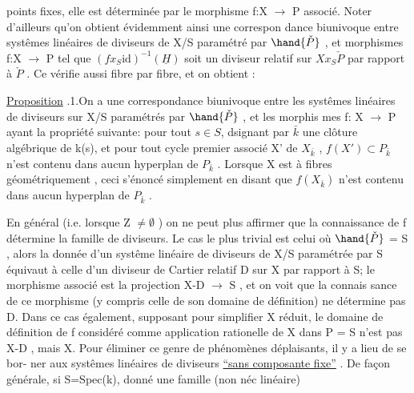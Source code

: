 
points fixes, elle est déterminée  par le morphisme f:X $\longrightarrow$ P
associé. Noter d'ailleurs qu'on obtient évidemment ainsi une correspon
dance biunivoque entre systêmes linéaires de diviseurs de X/S paramétré
par $\hand{\check{P}}$ , et morphismes f:X $\longrightarrow$ P tel que $(fx_S\mathrm{id})^{-1}(\underline{H})$ soit un
diviseur  relatif sur $Xx_S\check{P}$ par rapport à $\check{P}$ . Ce  
 vérifie aussi fibre par fibre, et on obtient :

\uline{Proposition} .1.On a une correspondance biunivoque entre les 
systêmes linéaires  de diviseurs sur X/S paramétrés par $\hand{\check{P}}$ , et les morphis
mes f: X $\longrightarrow$ P ayant la propriété suivante: pour tout $s\in S$, dsignant
par $\bar{k}$ une clôture algébrique de k(s), et pour tout cycle premier associé
X' de $X_{\bar{k}}$ , $f(X')\subset P_{\bar{k}}$ n'est contenu dans aucun hyperplan de $P_{\bar{k}}$ .
\hand{(}Lorsque X est à fibres géométriquement  , ceci 
 s'énoncé simplement en disant que $f(X_{\bar{k}})$ n'est contenu dans aucun
hyperplan de $P_{\bar{k}}$ \hand{)}.

En général (i.e.  lorsque Z $\neq \emptyset$ ) on ne peut plus affirmer que
la connaissance de f détermine la famille de diviseurs. Le cas le plus
trivial est celui où $\hand{\check{P}}$ = S , alors la donnée d'un systême linéaire de
diviseurs de X/S paramétrée par S équivaut à celle d'un diviseur de
Cartier relatif D sur X par rapport à S;  le morphisme
associé est la projection X-D $\longrightarrow$ S , et on voit  que la connais
sance de ce morphisme (y compris celle de son domaine de définition)
ne détermine pas D. Dans ce cas également, supposant pour simplifier X
réduit, le domaine de définition de  f  considéré
comme application rationelle de X dans P = S n'est pas X-D , mais X.
Pour éliminer ce genre de phénomènes déplaisants, il y a lieu de se bor-%
ner aux systêmes linéaires de diviseurs \uline{``sans composante fixe''} . De
façon générale, si S=Spec(k),  donné une famille (non néc linéaire)

